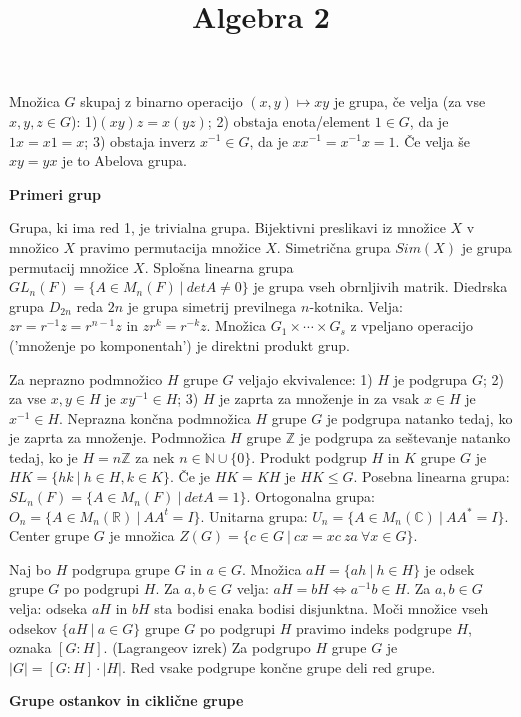 \documentclass[10pt]{extarticle}
\title{Algebra 2}
\author{}
\date{}
\begin{document}
Množica $G$ skupaj z binarno operacijo $(x,y)\mapsto xy$ je grupa, če velja (za vse $x,y,z\in G$): 1)$(xy)z=x(yz)$; 2) obstaja enota/element $1\in G$, da je $1x=x1=x$; 3) obstaja inverz $x^{-1}\in G$, da je $xx^{-1}=x^{-1}x=1$. Če velja še $xy=yx$ je to Abelova grupa.


    \textbf{Primeri grup}

        
             Grupa, ki ima red 1, je trivialna grupa.
             Bijektivni preslikavi iz množice $X$ v množico $X$ pravimo permutacija množice $X$. Simetrična grupa $Sim(X)$ je grupa permutacij množice $X$.
             Splošna linearna grupa $GL_n(F)=\{A\in M_n(F)~|~detA\neq 0\}$ je grupa vseh obrnljivih matrik.
             Diedrska grupa $D_{2n}$ reda $2n$ je grupa simetrij previlnega $n$-kotnika. Velja: $zr=r^{-1}z=r^{n-1}z$ in $zr^k=r^{-k}z$.
             Množica $G_1\times \cdots \times G_s$ z vpeljano operacijo ('množenje po komponentah') je direktni produkt grup.

            Za neprazno podmnožico $H$ grupe $G$ veljajo ekvivalence: 1) $H$ je podgrupa $G$; 2) za vse $x,y\in H$ je $xy^{-1}\in H$; 3) $H$ je zaprta za množenje in za vsak $x\in H$ je $x^{-1}\in H$.
             Neprazna končna podmnožica $H$ grupe $G$ je podgrupa natanko tedaj, ko je zaprta za množenje.
             Podmnožica $H$ grupe $\mathbb{Z}$ je podgrupa za seštevanje natanko tedaj, ko je $H=n\mathbb{Z}$ za nek $n\in\mathbb{N}\cup\{0\}$.
             Produkt podgrup $H$ in $K$ grupe $G$ je $HK=\{hk~|~h\in H, k\in K\}$. Če je $HK=KH$ je $HK\leq G$.
             Posebna linearna grupa: $SL_n(F)=\{A\in M_n(F)~|~detA=1\}$.
             Ortogonalna grupa: $O_n=\{A\in M_n(\mathbb{R})~|~AA^t=I\}$.
             Unitarna grupa: $U_n=\{A\in M_n(\mathbb{C})~|~AA^*=I\}$.
             Center grupe $G$ je množica $Z(G)=\{c\in G~|~cx=xc~ za ~ \forall x\in G\}$.


             Naj bo $H$ podgrupa grupe $G$ in $a\in G$. Množica $aH=\{ah~|~h\in H\}$ je odsek grupe $G$ po podgrupi $H$.
             Za $a,b\in G$ velja: $aH=bH\Leftrightarrow a^{-1}b\in H$.
             Za $a,b\in G$ velja: odseka $aH$ in $bH$ sta bodisi enaka bodisi disjunktna.
            Moči množice vseh odsekov $\{aH~|~a\in G\}$ grupe $G$ po podgrupi $H$ pravimo indeks podgrupe $H$, oznaka $\left[G:H\right]$.
            (Lagrangeov izrek) Za podgrupo $H$ grupe $G$ je $|G|=\left[G:H\right]\cdot|H|$.
            Red vsake podgrupe končne grupe deli red grupe.


    \textbf{Grupe ostankov in ciklične grupe}
        
\end{document}

